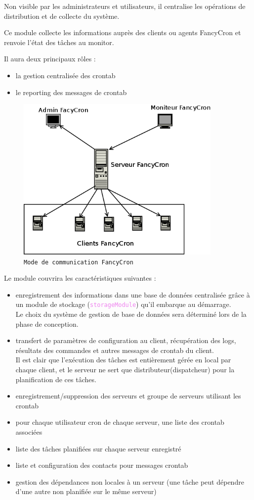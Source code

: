 \documentclass{bouygues-fr}
\begin{document}
Non visible par les administrateurs et utilisateurs, il centralise les opérations de distribution et de collecte du système.

Ce module collecte les informations auprès des clients ou agents FancyCron et renvoie l’état des tâches au monitor.

Il aura  deux principaux  rôles : 
\begin{itemize}
\item la gestion centralisée des crontab 
\item le reporting des messages de crontab
\end{itemize}

 \begin{figure}[H]
    \begin{center}
      \includegraphics[width=10cm]{Interaction.png}
    \end{center}
    \caption{\scriptsize \texttt{Mode de communication FancyCron}}
  \end{figure}
Le module couvrira les caractéristiques suivantes :
\begin{itemize}
\item enregistrement des informations dans une base de données centralisée grâce à un module de stockage (\textcolor{violet}{\texttt{storageModule}}) qu'il embarque au démarrage.\\
  Le choix du système de gestion de base de données sera déterminé lors de la phase de conception.
\item transfert de paramètres de configuration au client, récupération des logs, résultats des commandes et autres messages de crontab du client.\\
  Il est clair que l'exécution des tâches est entièrement gérée en local par chaque client, et le serveur ne sert que distributeur(dispatcheur) pour la planification de ces tâches.
\item enregistrement/suppression des serveurs et groupe de serveurs utilisant les crontab
\item pour chaque utilisateur cron de chaque serveur, une liste des crontab associées
\item liste des tâches planifiées sur chaque serveur enregistré
\item liste et configuration des contacts pour messages crontab
\item gestion des dépendances non locales à un serveur (une tâche peut dépendre d'une autre non planifiée sur le même serveur)
\end{itemize}
\end{document}
